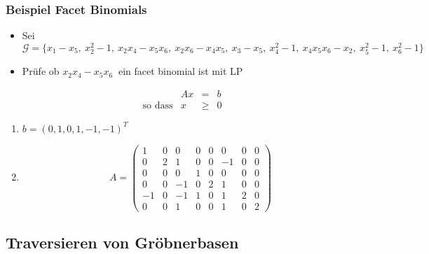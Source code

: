 \documentclass{beamer}
\begin{document}
\begin{frame}[<+->]
\frametitle{Beispiel Facet Binomials }

\begin{itemize}
\item Sei $\mathcal{G} = \{x_1 - x_5,~x_{2}^{2}-1,~x_{2}x_{4}-x_{5}x_{6},~x_{2}x_{6}-x_{4}x_{5},~x_{3}-x_{5},~x_{4}^{2}-1,~x_{4}x_{5}x_{6}-x_{2},~x_{5}^{2}-1,~x_{6}^{2}-1  \}~$
\item Prüfe ob $x_{2}x_{4}-x_{5}x_{6}~$ ein facet binomial ist mit LP
\end{itemize}

 \[
 	\begin{array}{lrcl}
 	\textrm{ }   & Ax    & =    & b   \\
 	\textrm{so dass}  & x     & \geq & 0
 			    
 	\end{array}
 \]
 
\begin{enumerate}
\item  $b = {\left(0,1,0,1,-1,-1\right)}^{T}$
\item  \[
 A =
 \begin{pmatrix}
 1  & 0 & 0  & 0 & 0 & 0  & 0 & 0\\ 
 0  & 2 & 1  & 0 & 0 & -1 & 0 & 0\\  
 0  & 0 & 0  & 1 & 0 & 0  & 0 & 0\\ 
 0  & 0 & -1 & 0 & 2 & 1  & 0 & 0\\
 -1 & 0 & -1 & 1 & 0 & 1  & 2 & 0\\
 0  & 0 & 1  & 0 & 0 & 1  & 0 & 2
 \end{pmatrix} 
 \] 
\end{enumerate}


\end{frame}

\subsection{Traversieren von Gröbnerbasen}
\end{document}
